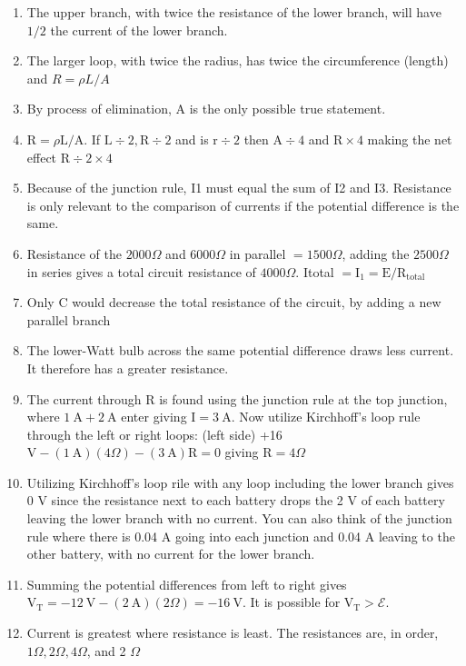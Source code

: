 \begin{enumerate}
\begin{enumerate}
  \item The upper branch, with twice the resistance of the lower branch, will have $1 / 2$ the current of the lower branch.
  \item The larger loop, with twice the radius, has twice the circumference (length) and $R=\rho L / A$
  \item By process of elimination, A is the only possible true statement.
  \item $\mathrm{R}=\rho \mathrm{L} / \mathrm{A}$. If $\mathrm{L} \div 2, \mathrm{R} \div 2$ and is $\mathrm{r} \div 2$ then $\mathrm{A} \div 4$ and $\mathrm{R} \times 4$ making the net effect $\mathrm{R} \div 2 \times 4$
  \item Because of the junction rule, I1 must equal the sum of I2 and I3. Resistance is only relevant to the comparison of currents if the potential difference is the same.
  \item Resistance of the $2000 \Omega$ and $6000 \Omega$ in parallel $=1500 \Omega$, adding the $2500 \Omega$ in series gives a total circuit resistance of $4000 \Omega$. Itotal $=\mathrm{I}_{1}=\mathrm{E} / \mathrm{R}_{\text {total }}$
  \item Only C would decrease the total resistance of the circuit, by adding a new parallel branch
  \item The lower-Watt bulb across the same potential difference draws less current. It therefore has a greater resistance.
  \item The current through R is found using the junction rule at the top junction, where $1 \mathrm{~A}+2 \mathrm{~A}$ enter giving $\mathrm{I}=3 \mathrm{~A}$. Now utilize Kirchhoff's loop rule through the left or right loops: (left side) +16 $\mathrm{V}-(1 \mathrm{~A})(4 \Omega)-(3 \mathrm{~A}) \mathrm{R}=0$ giving $\mathrm{R}=4 \Omega$
  \item Utilizing Kirchhoff's loop rile with any loop including the lower branch gives 0 V since the resistance next to each battery drops the 2 V of each battery leaving the lower branch with no current. You can also think of the junction rule where there is 0.04 A going into each junction and 0.04 A leaving to the other battery, with no current for the lower branch.
  \item Summing the potential differences from left to right gives $\mathrm{V}_{\mathrm{T}}=-12 \mathrm{~V}-(2 \mathrm{~A})(2 \Omega)=-16 \mathrm{~V}$. It is possible for $\mathrm{V}_{\mathrm{T}}>\mathcal{E}$.
  \item Current is greatest where resistance is least. The resistances are, in order, $1 \Omega, 2 \Omega, 4 \Omega$, and 2 $\Omega$

\end{enumerate}
\end{enumerate}
